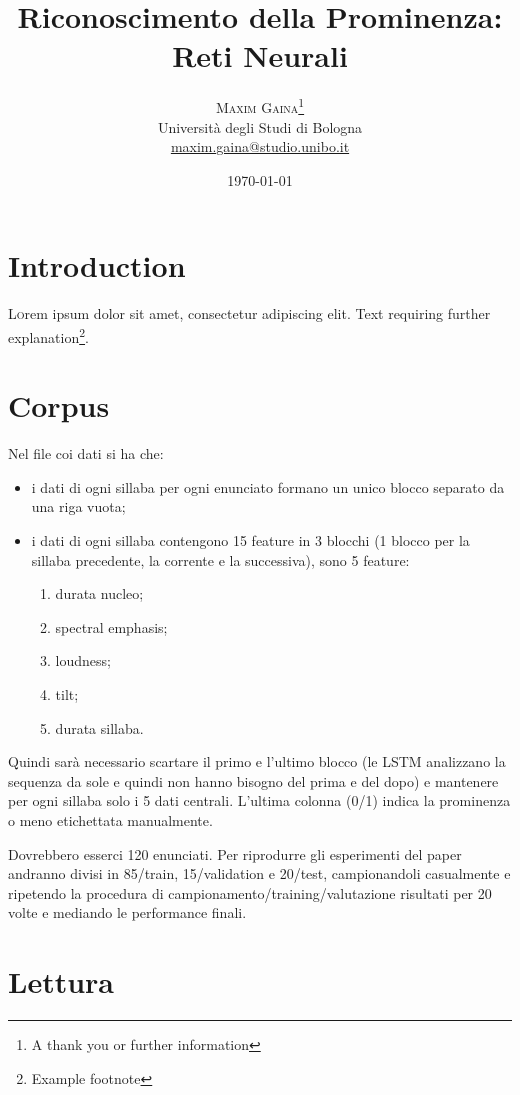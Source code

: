 \documentclass[twoside,twocolumn]{article}
\title{Riconoscimento della Prominenza: Reti Neurali} %
\author{%
\textsc{Maxim Gaina}\thanks{A thank you or further information} \\[1ex] %
\normalsize Università degli Studi di Bologna \\ %
\normalsize \href{mailto:maxim.gaina@studio.unibo.it}{maxim.gaina@studio.unibo.it}
}
\date{\today} %
\theoremstyle{definition}
\begin{document}
\maketitle

\section{Introduction}
	\lettrine[nindent=0em,lines=3]{L} orem ipsum dolor sit amet, consectetur adipiscing elit.
	Text requiring further explanation\footnote{Example footnote}.

\section{Corpus}
	Nel file coi dati si ha che:
	\begin{itemize}
		\item i dati di ogni sillaba per ogni enunciato formano un unico blocco separato da una riga vuota;
		\item i dati di ogni sillaba contengono 15 feature in 3 blocchi (1 blocco per la sillaba precedente, la corrente e la successiva), sono 5 feature:
		\begin{enumerate}
			\item durata nucleo;
			\item spectral emphasis;
			\item loudness;
			\item tilt;
			\item durata sillaba.
		\end{enumerate}
	\end{itemize}
	Quindi sarà necessario scartare il primo e l'ultimo blocco (le LSTM analizzano la 
	sequenza da sole e quindi non hanno bisogno del prima e del dopo) e mantenere per ogni sillaba solo i 5 dati centrali. L'ultima colonna (0/1) indica la prominenza o meno etichettata manualmente.
	
	Dovrebbero esserci 120 enunciati. Per riprodurre gli esperimenti del paper \cite{bib:prominence-detection-italian} andranno divisi in 85/train, 15/validation e 20/test, campionandoli casualmente e ripetendo la procedura di campionamento/training/valutazione risultati per 20 volte e mediando le performance finali.

\section{Lettura \cite{bib:fenomeni-prosodici-prominenza}}
\end{document}
